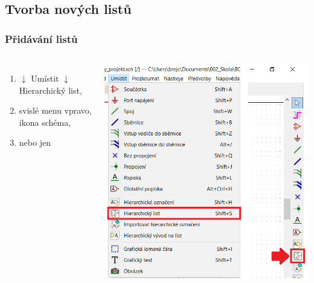 \documentclass{beamer}
\begin{document}
\subsection{\texorpdfstring{Tvorba nových listů}{Tvorba novych listu}}
\begin{frame}
	\frametitle{Přidávání listů}
	\begin{columns}
	
		\small
		\begin{enumerate}
			\item $\downarrow$ Umístit $\downarrow$ Hierarchický list,
			\item svislé menu vpravo, ikona schéma,
			\item {} nebo jen 
		\end{enumerate}
		
		\begin{center}
			\includegraphics[width=\textwidth]{obr/dalsi_strana01.png}
		\end{center}
		
	\end{columns}
\end{frame}
\end{document}
